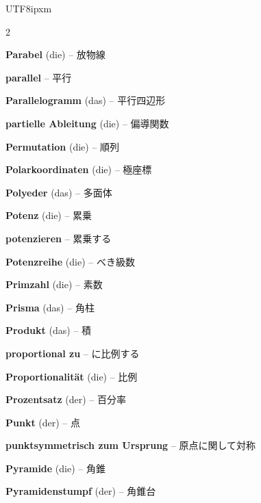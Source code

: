 \begin{CJK}{UTF8}{ipxm}
\begin{multicols}{2}
\par\nopagebreak
\textbf{Parabel} (die) -- 放物線\dotfill\hyperref[e:125]{\pageref*{e:125}}\par
\textbf{parallel} -- 平行\dotfill\hyperref[e:150]{\pageref*{e:150}}\par
\textbf{Parallelogramm} (das) -- 平行四辺形\dotfill\hyperref[e:200]{\pageref*{e:200}}\par
\textbf{partielle Ableitung} (die) -- 偏導関数\dotfill\hyperref[e:277]{\pageref*{e:277}}\par
\textbf{Permutation} (die) -- 順列\dotfill\hyperref[e:341]{\pageref*{e:341}}\par
\textbf{Polarkoordinaten} (die) -- 極座標\dotfill\hyperref[e:311]{\pageref*{e:311}}\par
\textbf{Polyeder} (das) -- 多面体\dotfill\hyperref[e:233]{\pageref*{e:233}}\par
\textbf{Potenz} (die) -- 累乗\dotfill\hyperref[e:42]{\pageref*{e:42}}\par
\textbf{potenzieren} -- 累乗する\dotfill\hyperref[e:50]{\pageref*{e:50}}\par
\textbf{Potenzreihe} (die) -- べき級数\dotfill\hyperref[e:267]{\pageref*{e:267}}\par
\textbf{Primzahl} (die) -- 素数\dotfill\hyperref[e:12]{\pageref*{e:12}}\par
\textbf{Prisma} (das) -- 角柱\dotfill\hyperref[e:228]{\pageref*{e:228}}\par
\textbf{Produkt} (das) -- 積\dotfill\hyperref[e:22]{\pageref*{e:22}}\par
\textbf{proportional zu} -- に比例する\dotfill\hyperref[e:68]{\pageref*{e:68}}\par
\textbf{Proportionalität} (die) -- 比例\dotfill\hyperref[e:94]{\pageref*{e:94}}\par
\textbf{Prozentsatz} (der) -- 百分率\dotfill\hyperref[e:58]{\pageref*{e:58}}\par
\textbf{Punkt} (der) -- 点\dotfill\hyperref[e:146]{\pageref*{e:146}}\par
\textbf{punktsymmetrisch zum Ursprung} -- 原点に関して対称\dotfill\hyperref[e:145]{\pageref*{e:145}}\par
\textbf{Pyramide} (die) -- 角錐\dotfill\hyperref[e:230]{\pageref*{e:230}}\par
\textbf{Pyramidenstumpf} (der) -- 角錐台\dotfill\hyperref[e:235]{\pageref*{e:235}}\par


\end{multicols}
\end{CJK}
